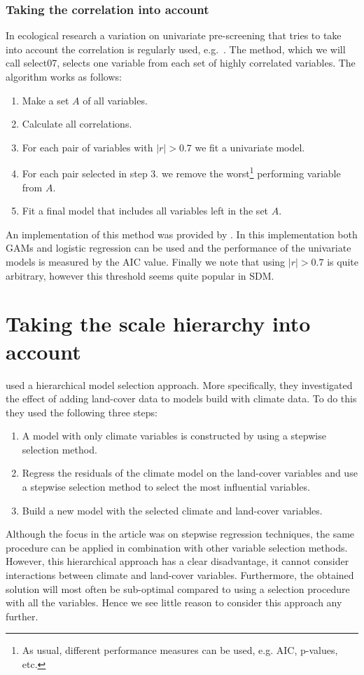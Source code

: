 \subsubsection{Taking the correlation into account}
In ecological research a variation on univariate pre-screening that tries to take into account the correlation is regularly used, e.g.\ \cite{cord_remote_2014}. The method, which we will call select07, selects one variable from each set of highly correlated variables. The algorithm works as follows:
\begin{enumerate}
\item Make a set $A$ of all variables.
\item Calculate all correlations.
\item For each pair of variables with $|r| > 0.7$ we fit a univariate model.
\item For each pair selected in step 3. we remove the worst\footnote{As usual, different performance measures can be used, e.g. AIC, p-values, etc.} performing variable from $A$.
\item Fit a final model that includes all variables left in the set $A$.
\end{enumerate}
An implementation of this method was provided by \cite{dormann_collinearity:_2013}. In this implementation both GAMs and logistic regression can be used and the performance of the univariate models is measured by the AIC value. Finally we note that using $|r| > 0.7$ is quite arbitrary, however this threshold seems quite popular in SDM.

\section{Taking the scale hierarchy into account}
\label{sec:TakingTheScaleHierarchyIntoAccount}
\cite{thuiller_we_2004} used a hierarchical model selection approach. More specifically, they investigated the effect of adding land-cover data to models build with climate data. To do this they used the following three steps:
\begin{enumerate}
\item A model with only climate variables is constructed by using a stepwise selection method.
\item Regress the residuals of the climate model on the land-cover variables and use a stepwise selection method to select the most influential variables.
\item Build a new model with the selected climate and land-cover variables.
\end{enumerate}
Although the focus in the article was on stepwise regression techniques, the same procedure can be applied in combination with other variable selection methods. However, this hierarchical approach has a clear disadvantage, it cannot consider interactions between climate and land-cover variables. Furthermore, the obtained solution will most often be sub-optimal compared to using a selection procedure with all the variables. Hence we see little reason to consider this approach any further.

